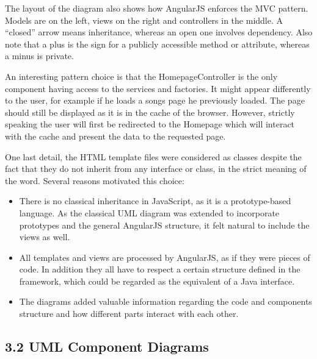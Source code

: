 \documentclass[]{article}
\begin{document}
The layout of the diagram also shows how AngularJS enforces the MVC
pattern. Models are on the left, views on the right and controllers in
the middle. A ``closed'' arrow means inheritance, whereas an open one
involves dependency. Also note that a plus is the sign for a publicly
accessible method or attribute, whereas a minus is private.

An interesting pattern choice is that the HomepageController is the only
component having access to the services and factories. It might appear
differently to the user, for example if he loads a songs page he
previously loaded. The page should still be displayed as it is in the
cache of the browser. However, strictly speaking the user will first be
redirected to the Homepage which will interact with the cache and
present the data to the requested page.

One last detail, the HTML template files were considered as classes despite the fact that they do not inherit from any interface or class, in the strict meaning of the word. Several reasons motivated this choice:

\begin{itemize}
\itemsep1pt\parskip0pt
\item
  There is no classical inheritance in JavaScript, as it is a prototype-based language. As the classical UML diagram was extended to incorporate prototypes and the general AngularJS structure, it felt natural to include the views as well.
\item
  All templates and views are processed by AngularJS, as if they were pieces of code. In addition they all have to respect a certain structure defined in the framework, which could be regarded as the equivalent of a Java interface.
\item
  The diagrams added valuable information regarding the code and components structure and how different parts interact with each other.
\end{itemize}

\subsection{3.2 UML Component Diagrams}\label{uml-component-diagrams}
\end{document}

